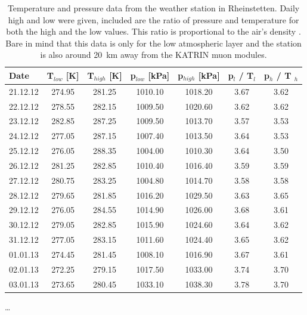 \begin{table}
\centering
	\begin{tabular}{| l | cc | cc| cc |}
	\hline
	Date & T$_{low}$ [K] & T$_{high}$ [K] & p$_{low}$ [kPa] & p$_{high}$ [kPa] & p$_l$ / T$_l$ & p$_h$ / T $_h$ \\
	\hline
	21.12.12 & 274.95 & 281.25 & 1010.10 & 1018.20 & 3.67 & 3.62\\
	22.12.12 & 278.55 & 282.15 & 1009.50 & 1020.60 & 3.62 & 3.62\\
	23.12.12 & 282.85 & 287.25 & 1009.50 & 1013.70 & 3.57 & 3.53\\
	24.12.12 & 277.05 & 287.15 & 1007.40 & 1013.50 & 3.64 & 3.53\\
	25.12.12 & 276.05 & 288.35 & 1004.00 & 1010.30 & 3.64 & 3.50\\
	26.12.12 & 281.25 & 282.85 & 1010.40 & 1016.40 & 3.59 & 3.59\\
	27.12.12 & 280.75 & 283.25 & 1004.80 & 1014.70 & 3.58 & 3.58\\
	28.12.12 & 279.65 & 281.85 & 1016.20 & 1029.50 & 3.63 & 3.65\\
	29.12.12 & 276.05 & 284.55 & 1014.90 & 1026.00 & 3.68 & 3.61\\
	30.12.12 & 279.05 & 282.85 & 1015.90 & 1024.60 & 3.64 & 3.62\\
	31.12.12 & 277.05 & 283.15 & 1011.60 & 1024.40 & 3.65 & 3.62\\
	01.01.13 & 274.45 & 281.45 & 1008.10 & 1016.90 & 3.67 & 3.61\\
	02.01.13 & 272.25 & 279.15 & 1017.50 & 1033.00 & 3.74 & 3.70\\
	03.01.13 & 273.65 & 280.45 & 1033.10 & 1038.30 & 3.78 & 3.70\\
	\hline
	
	\end{tabular}
	\caption[Temperature and pressure Rheinstetten]{Temperature and pressure data from the weather station in Rheinstetten. Daily high and low were given, included are the ratio of pressure and temperature for both the high and the low values. This ratio is proportional to the air's density . Bare in mind that this data is only for the low atmospheric layer and the station is also around \SI{20}{\kilo\meter} away  from the KATRIN muon modules.}
	\label{fig:weatherData}
\end{table}


\dots



